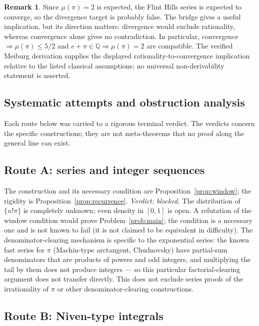 \documentclass[11pt]{amsart}
\theoremstyle{definition}
\newtheorem{remark}[theorem]{Remark}
\theoremstyle{remark}
\numberwithin{equation}{section}
\newcommand{\Q}{\mathbb{Q}}
\newcommand{\irr}{\mu}
\begin{document}
\begin{remark}
Since $\irr(\pi)=2$ is expected, the Flint Hills series is expected to converge, so the divergence target is probably false. The bridge gives a useful implication, but its direction matters: divergence would exclude rationality, whereas convergence alone gives no contradiction. In particular, convergence $\Rightarrow\irr(\pi)\le5/2$ and $e+\pi\in\Q\Rightarrow\irr(\pi)=2$ are compatible. The verified Meiburg derivation supplies the displayed rationality-to-convergence implication relative to the listed classical assumptions; no universal non-derivability statement is asserted.
\end{remark}

\subsection*{Systematic attempts and obstruction analysis}

Each route below was carried to a rigorous terminal verdict. The verdicts concern the specific constructions; they are not meta-theorems that no proof along the general line can exist.

\subsection{Route A: series and integer sequences}\label{sec:obstructions}

The construction and its necessary condition are Proposition~\ref{prop:window}; the rigidity is Proposition~\ref{prop:recurrence}. \emph{Verdict: blocked.} The distribution of $\{n!\pi\}$ is completely unknown; even density in $[0,1]$ is open. A refutation of the window condition would prove Problem~\ref{prob:main}; the condition is a necessary one and is not known to fail (it is not claimed to be equivalent in difficulty). The denominator-clearing mechanism is specific to the exponential series: the known fast series for $\pi$ (Machin-type arctangent, Chudnovsky) have partial-sum denominators that are products of powers and odd integers, and multiplying the tail by them does not produce integers --- so this particular factorial-clearing argument does not transfer directly. This does not exclude series proofs of the irrationality of $\pi$ or other denominator-clearing constructions.

\subsection{Route B: Niven-type integrals}\label{sub:route-b}
\end{document}
